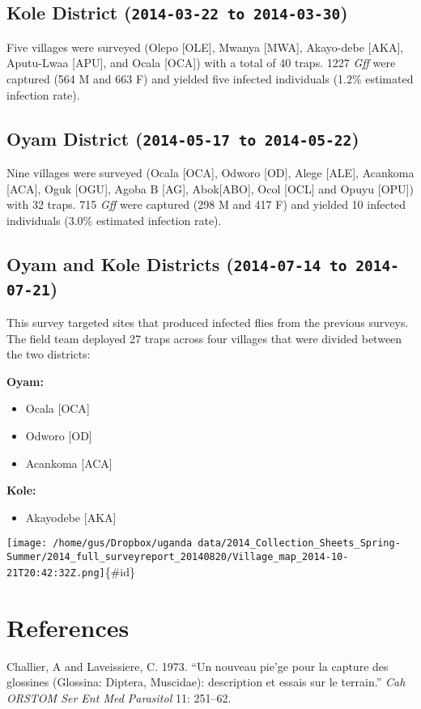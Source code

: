 \documentclass[letterpaper]{report}
\begin{document}
\subsection{Kole District
(\texttt{2014-03-22 to 2014-03-30})}\label{kole-district-2014-03-22-to-2014-03-30}

Five villages were surveyed (Olepo {[}OLE{]}, Mwanya {[}MWA{]},
Akayo-debe {[}AKA{]}, Aputu-Lwaa {[}APU{]}, and Ocala {[}OCA{]}) with a
total of 40 traps. 1227 \emph{Gff} were captured (564 M and 663 F) and
yielded five infected individuals (1.2\% estimated infection rate).

\subsection{Oyam District
(\texttt{2014-05-17 to 2014-05-22})}\label{oyam-district-2014-05-17-to-2014-05-22}

Nine villages were surveyed (Ocala {[}OCA{]}, Odworo {[}OD{]}, Alege
{[}ALE{]}, Acankoma {[}ACA{]}, Oguk {[}OGU{]}, Agoba B {[}AG{]},
Abok{[}ABO{]}, Ocol {[}OCL{]} and Opuyu {[}OPU{]}) with 32 traps. 715
\emph{Gff} were captured (298 M and 417 F) and yielded 10 infected
individuals (3.0\% estimated infection rate).

\subsection{Oyam and Kole Districts
(\texttt{2014-07-14 to 2014-07-21})}\label{oyam-and-kole-districts-2014-07-14-to-2014-07-21}

This survey targeted sites that produced infected flies from the
previous surveys. The field team deployed 27 traps across four villages
that were divided between the two districts:

\textbf{Oyam:}

\begin{itemize}
\itemsep1pt\parskip0pt
\item
  Ocala {[}OCA{]}
\item
  Odworo {[}OD{]}
\item
  Acankoma {[}ACA{]}
\end{itemize}

\textbf{Kole:}

\begin{itemize}
\itemsep1pt\parskip0pt
\item
  Akayodebe {[}AKA{]}
\end{itemize}

\texttt{[image: /home/gus/Dropbox/uganda data/2014\_Collection\_Sheets\_Spring-Summer/2014\_full\_surveyreport\_20140820/Village\_map\_2014-10-21T20:42:32Z.png]}\{\#id\}

\section*{References}\label{references}

{Challier, A and Laveissiere}, C. 1973. ``Un nouveau pie'ge pour la
capture des glossines (Glossina: Diptera, Muscidae): description et
essais sur le terrain.'' \emph{Cah ORSTOM Ser Ent Med Parasitol} 11:
251--62.
\end{document}
